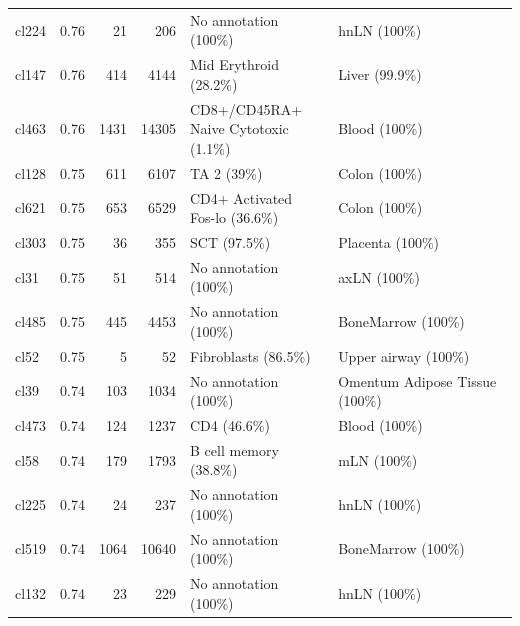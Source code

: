 \begin{table}[ht!]
\begin{tabular}{lrrrll}
  cl224 & 0.76 &  21 & 206 & No annotation (100\%) & hnLN (100\%) \\ 
  cl147 & 0.76 & 414 & 4144 & Mid Erythroid (28.2\%) & Liver (99.9\%) \\ 
  cl463 & 0.76 & 1431 & 14305 & \specialcell[t]{CD8+/CD45RA+\\Naive Cytotoxic (1.1\%)} & Blood (100\%) \\ 
  cl128 & 0.75 & 611 & 6107 & TA 2 (39\%) & Colon (100\%) \\ 
  cl621 & 0.75 & 653 & 6529 & \specialcell[t]{CD4+ Activated\\Fos-lo (36.6\%)} & Colon (100\%) \\ 
  cl303 & 0.75 &  36 & 355 & SCT (97.5\%) & Placenta (100\%) \\ 
  cl31 & 0.75 &  51 & 514 & No annotation (100\%) & axLN (100\%) \\ 
  cl485 & 0.75 & 445 & 4453 & No annotation (100\%) & BoneMarrow (100\%) \\ 
  cl52 & 0.75 &   5 &  52 & Fibroblasts (86.5\%) & Upper airway (100\%) \\ 
  cl39 & 0.74 & 103 & 1034 & No annotation (100\%) & Omentum Adipose Tissue (100\%) \\ 
  cl473 & 0.74 & 124 & 1237 & CD4 (46.6\%) & Blood (100\%) \\ 
  cl58 & 0.74 & 179 & 1793 & B cell memory (38.8\%) & mLN (100\%) \\ 
  cl225 & 0.74 &  24 & 237 & No annotation (100\%) & hnLN (100\%) \\ 
  cl519 & 0.74 & 1064 & 10640 & No annotation (100\%) & BoneMarrow (100\%) \\ 
  cl132 & 0.74 &  23 & 229 & No annotation (100\%) & hnLN (100\%) \\ 
   \bottomrule
\end{tabular}
\end{table}  
  
